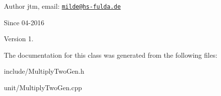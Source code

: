 \begin{DoxyAuthor}{Author}
jtm, email\+:  \href{mailto:milde@hs-fulda.de}{\tt milde@hs-\/fulda.\+de} 
\end{DoxyAuthor}
\begin{DoxySince}{Since}
04-\/2016 
\end{DoxySince}
\begin{DoxyVersion}{Version}
1. 
\end{DoxyVersion}


The documentation for this class was generated from the following files\+:\begin{DoxyCompactItemize}
\item 
include/Multiply\+Two\+Gen.\+h\item 
unit/Multiply\+Two\+Gen.\+cpp\end{DoxyCompactItemize}

